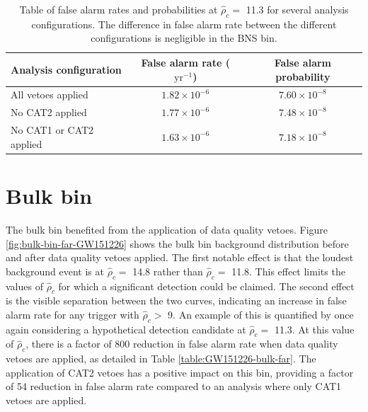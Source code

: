 \begin{table}[!ht]%
  \begin{center}
    \begin{tabular}{lcc}
      \hline
      Analysis configuration & False alarm rate ($\mathrm{yr}^{-1}$) & False alarm probability \\ \hline
      All vetoes applied & $1.82\times10^{-6}$  & $7.60\times10^{-8}$ \\
      No CAT2 applied & $1.77\times10^{-6}$ & $7.48\times10^{-8}$ \\
      No CAT1 or CAT2 applied & $1.63\times10^{-6}$ & $7.18\times10^{-8}$ \\ \hline
    \end{tabular}
  \end{center}
  \caption[BNS bin FAR - GW151226 analysis]{Table of false alarm rates and probabilities at $\hat{\rho}_{c} =$ 11.3 for several analysis configurations. %
           The difference in false alarm rate between the different configurations is negligible %
           in the BNS bin.}
  \label{table:151226-bns-far}
\end{table}

\section{Bulk bin}

The bulk bin benefited from the application of data quality vetoes. Figure
\ref{fig:bulk-bin-far-GW151226} shows the bulk bin background distribution before and after
data quality vetoes applied. The first notable
effect is that the loudest background event is at $\hat{\rho}_{c} =$ 14.8 rather than
$\hat{\rho}_{c} =$ 11.8. This effect
limits the values of $\hat{\rho}_{c}$ for which a significant detection could be claimed.
The second effect is the visible separation between the two curves, indicating an
increase in false alarm rate for any trigger with $\hat{\rho}_{c} >$ 9. An example of this is
quantified by once again considering a hypothetical detection candidate at $\hat{\rho}_{c} =$ 11.3.
At this value of $\hat{\rho}_{c}$, there is a factor of 800 reduction in false alarm rate when
data quality vetoes are applied, as detailed in Table \ref{table:GW151226-bulk-far}.
The application of CAT2 vetoes has a positive impact on this bin, providing a factor of 54
reduction in false alarm rate compared to an analysis where only CAT1 vetoes are applied.


